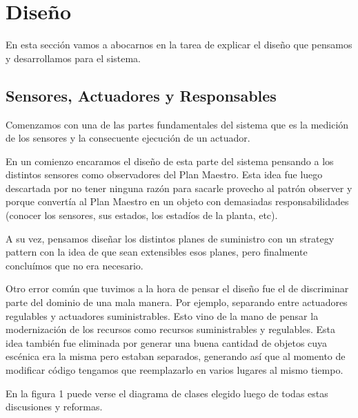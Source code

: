 \section{Diseño}
En esta sección vamos a abocarnos en la tarea de explicar el diseño que pensamos y desarrollamos para el sistema.


\subsection{Sensores, Actuadores y Responsables}
Comenzamos con una de las partes fundamentales del sistema que es la medición de los sensores y la consecuente ejecución de un actuador. \newline

 
En un comienzo encaramos el diseño de esta parte del sistema pensando a los distintos sensores como observadores del Plan Maestro. Esta idea fue luego descartada por no tener ninguna razón para sacarle provecho al patrón observer y porque convertía al Plan Maestro en un objeto con demasiadas responsabilidades (conocer los sensores, sus estados, los estadíos de la planta, etc).

A su vez, pensamos diseñar los distintos planes de suministro con un strategy pattern con la idea de que sean extensibles esos planes, pero finalmente concluímos que no era necesario.\newline


 
Otro error común que tuvimos a la hora de pensar el diseño fue el de discriminar parte del dominio de una mala manera. Por ejemplo, separando entre actuadores regulables y actuadores suministrables. Esto vino de la mano de pensar la modernización de los recursos como recursos suministrables y regulables. Esta idea también fue eliminada por generar una buena cantidad de objetos cuya escénica era la misma pero estaban separados, generando así que al momento de modificar código tengamos que reemplazarlo en varios lugares al mismo tiempo.\newline

 
En la figura 1 puede verse el diagrama de clases elegido luego de todas estas discusiones y reformas.

